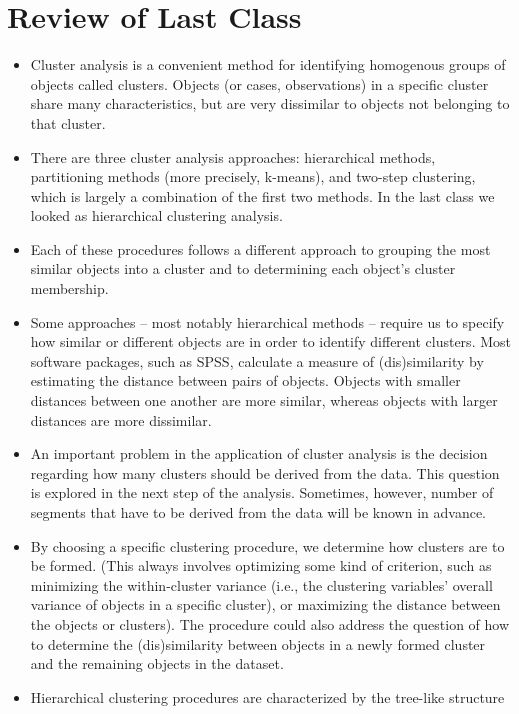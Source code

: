 \documentclass[a4paper,12pt]{article}
\begin{document}
\tableofcontents
\newpage

\section{Review of Last Class}
\begin{itemize}
\item Cluster analysis is a convenient method for identifying homogenous groups of
objects called clusters. Objects (or cases, observations) in a specific cluster share
many characteristics, but are very dissimilar to objects not belonging to that cluster.
\item  There are three cluster analysis approaches: hierarchical methods,
partitioning methods (more precisely, k-means), and two-step clustering,
which is largely a combination of the first two methods. In the last class we looked as hierarchical clustering analysis.
\item Each of these procedures
follows a different approach to grouping the most similar objects into a cluster and
to determining each object’s cluster membership.
\item Some approaches – most notably hierarchical methods – require us to specify how similar or different objects
    are in order to identify different clusters. Most software packages, such as SPSS, calculate a measure
of (dis)similarity by estimating the distance between pairs of objects. Objects with
smaller distances between one another are more similar, whereas objects with larger
distances are more dissimilar.
\item An important problem in the application of cluster analysis is the decision
regarding how many clusters should be derived from the data. This question is
explored in the next step of the analysis. Sometimes, however,
number of segments that have to be derived from the data will be known in advance.
\item
By choosing a specific clustering procedure, we determine how clusters are to be
formed. (This always involves optimizing some kind of criterion, such as minimizing
the within-cluster variance (i.e., the clustering variables’ overall variance of
objects in a specific cluster), or maximizing the distance between the objects or
clusters). The procedure could also address the question of how to determine the
(dis)similarity between objects in a newly formed cluster and the remaining objects
in the dataset.
\item
Hierarchical clustering procedures are characterized by the tree-like structure

\end{itemize}
\end{document}
